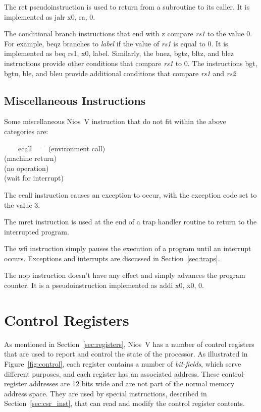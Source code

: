 \documentclass[11pt, twoside, pdftex]{article}
\newenvironment{ctabbing}%
{\begin{center}\begin{minipage}{\textwidth}\begin{tabbing}}
{\end{tabbing}\end{minipage}\end{center}}
\begin{document}
The {\sf ret} pseudoinstruction is used to return from a subroutine to its caller. It is
implemented as {\sf jalr x0, ra, 0}.

The conditional branch instructions that end with {\sf z} compare {\it rs1} to the value 0.
For example, {\sf beqz} branches to {\it label} if the value of {\it rs1} is equal to 0. 
It is implemented as {\sf beq rs1, x0, label}. Similarly, the {\sf bnez}, {\sf bgtz},
{\sf bltz}, and {\sf blez} instructions provide other conditions that compare {\it rs1} to 0.
The instructions {\sf bgt}, {\sf bgtu}, {\sf ble}, and {\sf bleu} provide additional 
conditions that compare {\it rs1} and {\it rs2}. 

\subsection{Miscellaneous Instructions}
\label{sec:misc}

Some miscellaneous Nios~V instruction that do not fit within the above categories are:
\begin{ctabbing}
~~~~\={\sf ecall}~~~~\=\kill
{} \>(environment call)\\
 \>(machine return)\\
 \>(no operation)\\
 \>(wait for interrupt)\\
\end{ctabbing}
\vspace{-\baselineskip}
The {\sf ecall} instruction causes an exception to occur, with the exception code set to 
the value 3. 

The {\sf mret} instruction is used at the end of a trap handler routine to return to the 
interrupted program.  

The {\sf wfi} instruction simply pauses the execution of a program until an interrupt
occurs. Exceptions and interrupts are discussed in Section~\ref{sec:traps}.

The {\sf nop} instruction doesn't have any effect and simply advances the program counter. 
It is a pseudoinstruction implemented as {\sf addi x0, x0, 0}.

\section{Control Registers}
\label{sec:control}

As mentioned in Section~\ref{sec:registers}, Nios~V has a number of control registers
that are used to report and control the state of the processor. As illustrated in 
Figure~\ref{fig:control}, each register contains a number of {\it bit-fields}, which serve 
different purposes, and each register has an associated address. These control-register
addresses are 12 bits wide and are not part of the normal memory address space. They  
are used by special instructions, described in Section~\ref{sec:csr_inst}, that can read 
and modify the control register contents. 
\end{document}
